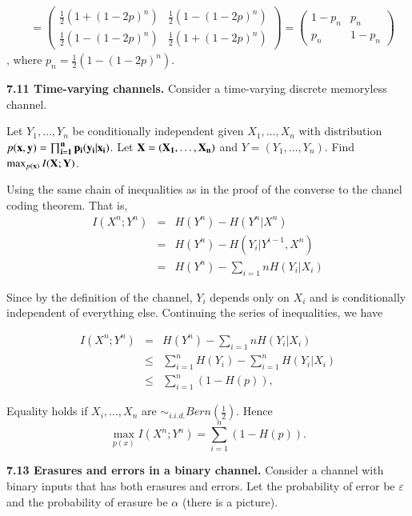 \documentclass[10pt]{article}
\begin{document}
\begin{tiny}
\begin{multicols}{3}
\begin{align*}
&= \begin{pmatrix}
        \frac{1}{2}(1 + (1-2p)^n) & \frac{1}{2}(1 - (1-2p)^n) \\
        \frac{1}{2}(1 - (1-2p)^n) & \frac{1}{2}(1 + (1-2p)^n) \end{pmatrix}
    = \begin{pmatrix} 1 - p_n & p_n \\
        p_n & 1 - p_n \end{pmatrix} 
\end{align*} , where  $p_n = \frac{1}{2}(1 - (1-2p)^n)$.

\textbf{\scriptsize 7.11 Time-varying channels.}
Consider a time-varying discrete memoryless channel.

Let $Y_1,\dots,Y_n$ be conditionally independent given $X_1,\dots,X_n$ with distribution $p(\bf{x}, \bf{y}) = \prod_{i=1}^{n}p_i(y_i|x_i)$. Let $\bf{X} = (X_1,\dots,X_n)$ and $Y=(Y_1,\dots,Y_n)$. Find $\max_{p(\bf{x})} I(\bf{X};\bf{Y})$.

Using the same chain of inequalities as in the proof of the converse to the chanel coding theorem. That is,
\begin{eqnarray*}
    I(X^n;Y^n) &=& H(Y^n) - H(Y^n|X^n) \\ 
        &=& H(Y^n) - H(Y_i | Y^{i-1}, X^n)  \\
        &=& H(Y^n) - \sum_{i=1}{n} H(Y_i | X_i)
\end{eqnarray*}

Since by the definition of the channel, $Y_i$ depends only on $X_i$ and is conditionally independent of everything else. Continuing the series of inequalities, we have

\begin{eqnarray*}
    I(X^n;Y^n) &=& H(Y^n) - \sum_{i=1}{n} H(Y_i | X_i) \\
    &\le& \sum_{i=1}^{n} H(Y_i) - \sum_{i=1}^{n}H(Y_i | X_i) \\ 
    &\le& \sum_{i=1}^{n} (1-H(p)),
\end{eqnarray*}

Equality holds if $X_i,\dots,X_n$ are $\sim_{i.i.d.} Bern(\frac{1}{2})$. Hence
\begin{equation*}
    \max_{p(x)} I(X^n; Y^n) = \sum_{i=1}^{n}(1-H(p)).
\end{equation*}

\textbf{\scriptsize 7.13 Erasures and errors in a binary channel.}
Consider a channel with binary inputs that has both erasures and errors. Let the probability of error be $\varepsilon$ and the probability of erasure be $\alpha$ (there is a picture).


\end{multicols}
\end{tiny}
\end{document}
